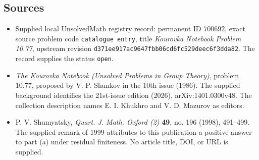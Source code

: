 \documentclass[11pt]{article}
\begin{document}
\subsection{Sources}
\begin{itemize}
\item Supplied local UnsolvedMath registry record: permanent ID \(700692\), exact source problem code \texttt{catalogue entry}, title \emph{Kourovka Notebook Problem 10.77}, upstream revision \texttt{d371ee917ac9647fbb06cd6fc529deec6f3dda82}. The record supplies the status \texttt{open}.
\item \emph{The Kourovka Notebook (Unsolved Problems in Group Theory)}, problem 10.77, proposed by V. P. Shunkov in the 10th issue (1986). The supplied background identifies the 21st-issue edition (2026), arXiv:1401.0300v48. The collection description names E. I. Khukhro and V. D. Mazurov as editors.
\item P. V. Shumyatsky, \emph{Quart. J. Math. Oxford (2)} \textbf{49}, no. 196 (1998), 491--499. The supplied remark of 1999 attributes to this publication a positive answer to part (a) under residual finiteness. No article title, DOI, or URL is supplied.
\end{itemize}
\end{document}
